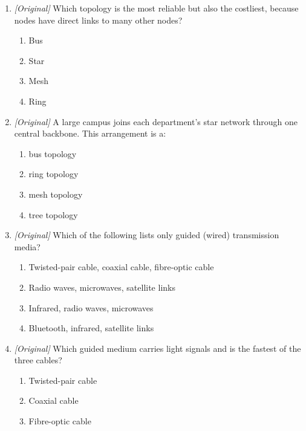 \documentclass[11pt]{article}
\begin{document}
\begin{enumerate}[label=\textbf{Q\arabic*.}, leftmargin=*]
\begin{enumerate}[label=\Alph*.]
    \item connects to one central hub that stores all the data.
    \item connects to exactly two neighbours, forming a closed circle.
    \item has a direct link to every other node in the network.
    \item joins the network only through a satellite link.
  \end{enumerate}
\item \textit{[Original]} Which topology is the most reliable but also the
  costliest, because nodes have direct links to many other nodes?
  \begin{enumerate}[label=\Alph*.]
    \item Bus
    \item Star
    \item Mesh
    \item Ring
  \end{enumerate}
\item \textit{[Original]} A large campus joins each department's star network
  through one central backbone. This arrangement is a:
  \begin{enumerate}[label=\Alph*.]
    \item bus topology
    \item ring topology
    \item mesh topology
    \item tree topology
  \end{enumerate}
\item \textit{[Original]} Which of the following lists only guided
  (wired) transmission media?
  \begin{enumerate}[label=\Alph*.]
    \item Twisted-pair cable, coaxial cable, fibre-optic cable
    \item Radio waves, microwaves, satellite links
    \item Infrared, radio waves, microwaves
    \item Bluetooth, infrared, satellite links
  \end{enumerate}
\item \textit{[Original]} Which guided medium carries light signals and is the
  fastest of the three cables?
  \begin{enumerate}[label=\Alph*.]
    \item Twisted-pair cable
    \item Coaxial cable
    \item Fibre-optic cable

\end{enumerate}
\end{enumerate}
\end{document}
